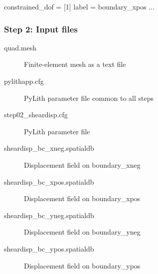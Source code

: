 \documentclass[aspectratio=169]{beamer}
\begin{document}
\begin{frame}[t,fragile]
\begin{minipage}[t]{0.60\textwidth}
\begin{onlyenv}
\begin{cfgcode}
        constrained_dof = [1]
        label = boundary_xpos
        ...
      \end{cfgcode}
    \end{onlyenv}
  \end{minipage}

    

  
\end{frame}


\begin{frame}
  \frametitle{Step 2: Input files}
  \summary{}

  \begin{description}
  \item[quad.mesh] Finite-element mesh as a text file
  \item[pylithapp.cfg] PyLith parameter file common to all steps
  \item[step02\_sheardisp.cfg] PyLith parameter file
  \item[sheardisp\_bc\_xneg.spatialdb] Displacement field on boundary\_xneg
  \item[sheardisp\_bc\_xpos.spatialdb] Displacement field on boundary\_xpos
  \item[sheardisp\_bc\_yneg.spatialdb] Displacement field on boundary\_yneg
  \item[sheardisp\_bc\_ypos.spatialdb] Displacement field on boundary\_ypos
  \end{description}
    
\end{frame}
\end{document}
